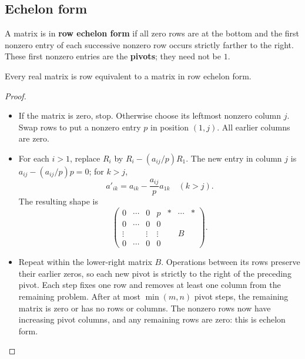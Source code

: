 \subsection*{Echelon form}
A matrix is in \textbf{row echelon form} if all zero rows are at the
bottom and the first nonzero entry of each successive nonzero row occurs
strictly farther to the right. These first nonzero entries are the
\textbf{pivots}; they need not be \(1\).

\begin{theorem}\label{thm:01:echelon}
Every real matrix is row equivalent to a matrix in row echelon form.
\end{theorem}
\begin{proof}
\begin{itemize}
\item If the matrix is zero, stop. Otherwise choose its leftmost nonzero
column \(j\). Swap rows to put a nonzero entry \(p\) in position \((1,j)\).
All earlier columns are zero.
\item For each \(i>1\), replace \(R_i\) by \(R_i-(a_{ij}/p)R_1\).
The new entry in column \(j\) is \(a_{ij}-(a_{ij}/p)p=0\); for \(k>j\),
\[
a'_{ik}=a_{ik}-\frac{a_{ij}}p a_{1k}\quad(k>j).
\]
The resulting shape is
\[
\begin{pmatrix}
0&\cdots&0&p&* &\cdots&*\\
0&\cdots&0&0&&&\\
\vdots&&\vdots&\vdots&&B&\\
0&\cdots&0&0&&&
\end{pmatrix}.
\]
\item {}Repeat within the lower-right matrix \(B\).
Operations between its rows preserve their earlier zeros, so each new
pivot is strictly to the right of the preceding pivot.
Each step fixes one row and removes at least one column from the remaining
problem. After at most \(\min(m,n)\) pivot steps, the remaining matrix
is zero or has no rows or columns. The nonzero rows now have increasing
pivot columns, and any remaining rows are zero: this is echelon form.
\end{itemize}
\end{proof}

